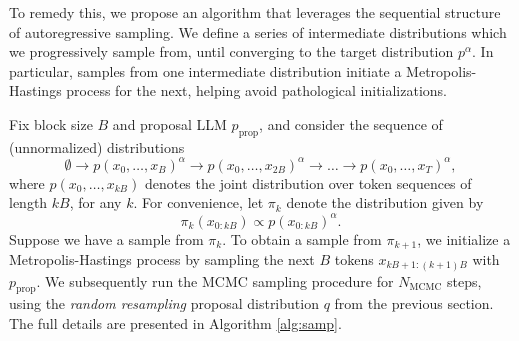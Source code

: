 \documentclass{article}
\begin{document}
To remedy this, we propose an algorithm that leverages the sequential structure of autoregressive sampling. We define a series of intermediate distributions which we  progressively sample from, until converging to the target distribution $p^{\alpha}$. In particular, samples from one intermediate distribution initiate a Metropolis-Hastings process for the next, helping avoid pathological initializations. 


Fix block size $B$ and proposal LLM $p_{\text{prop}}$, and consider the sequence of (unnormalized) distributions
\begin{equation}
    \emptyset \longrightarrow p(x_0, \dots, x_B)^{\alpha} \longrightarrow p(x_0, \dots, x_{2B})^{\alpha} \longrightarrow \dots \longrightarrow p(x_0, \dots, x_T)^{\alpha},
\end{equation}
where $p(x_0, \dots, x_{kB})$ denotes the joint distribution over token sequences of length $kB$, for any $k$. For convenience, let $\pi_k$ denote the distribution given by \begin{equation}
    \pi_k(x_{0:kB}) \propto p(x_{0:kB})^{\alpha}.
\end{equation}
Suppose we have a sample from $\pi_k$. To obtain a sample from $\pi_{k+1}$, we initialize a Metropolis-Hastings process by sampling the next $B$ tokens $x_{kB+1:(k+1)B}$ with $p_{\text{prop}}$. We subsequently run the MCMC sampling procedure for $N_{\text{MCMC}}$ steps, using the \textit{random resampling} proposal distribution $q$ from the previous section. The full details are presented in Algorithm \ref{alg:samp}.
\end{document}
